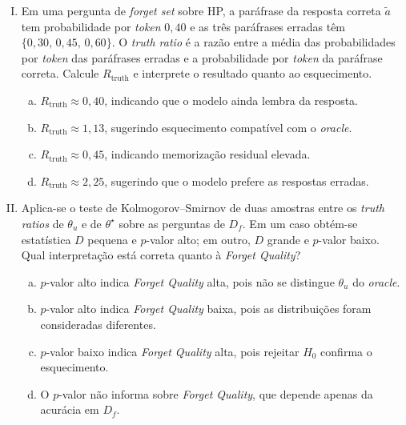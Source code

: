 \documentclass{dlproblemset}
\begin{document}
\begin{enumerate}[I)]
    \item Em uma pergunta de \textit{forget set} sobre HP, a paráfrase da resposta correta $\tilde{a}$ tem probabilidade por \textit{token} $0{,}40$ e as três paráfrases erradas têm $\{0{,}30,\, 0{,}45,\, 0{,}60\}$. O \textit{truth ratio} é a razão entre a média das probabilidades por \textit{token} das paráfrases erradas e a probabilidade por \textit{token} da paráfrase correta. Calcule $R_{\text{truth}}$ e interprete o resultado quanto ao esquecimento.
    \begin{enumerate}[(a)]
        \item $R_{\text{truth}} \approx 0{,}40$, indicando que o modelo ainda lembra da resposta.
        \item $R_{\text{truth}} \approx 1{,}13$, sugerindo esquecimento compatível com o \textit{oracle}.
        \item $R_{\text{truth}} \approx 0{,}45$, indicando memorização residual elevada.
        \item $R_{\text{truth}} \approx 2{,}25$, sugerindo que o modelo prefere as respostas erradas.
    \end{enumerate}

    \item Aplica-se o teste de Kolmogorov--Smirnov de duas amostras entre os \textit{truth ratios} de $\theta_u$ e de $\theta^\star$ sobre as perguntas de $D_f$. Em um caso obtém-se estatística $D$ pequena e $p$-valor alto; em outro, $D$ grande e $p$-valor baixo. Qual interpretação está correta quanto à \textit{Forget Quality}?
    \begin{enumerate}[(a)]
        \item $p$-valor alto indica \textit{Forget Quality} alta, pois não se distingue $\theta_u$ do \textit{oracle}.
        \item $p$-valor alto indica \textit{Forget Quality} baixa, pois as distribuições foram consideradas diferentes.
        \item $p$-valor baixo indica \textit{Forget Quality} alta, pois rejeitar $H_0$ confirma o esquecimento.
        \item O $p$-valor não informa sobre \textit{Forget Quality}, que depende apenas da acurácia em $D_f$.
    \end{enumerate}


\end{enumerate}
\end{document}
